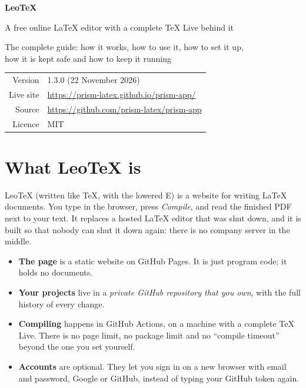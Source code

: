 \documentclass[11pt,a4paper]{article}
\newcommand{\leotex}{Leo\TeX{}}
\begin{document}
\begin{titlepage}
\centering
\vspace*{3cm}
{\fontsize{56}{60}\selectfont\bfseries\color{accent}\leotex{}}\par
\vspace{0.6cm}
{\Large A free online \LaTeX{} editor with a complete \TeX{} Live behind it}\par
\vspace{1.2cm}
{\large The complete guide: how it works, how to use it, how to set it up,\\ how it is kept safe and how to keep it running}\par
\vfill
\begin{tabular}{rl}
Version & 1.3.0 (22 November 2026)\\
Live site & \url{https://prism-latex.github.io/prism-app/}\\
Source & \url{https://github.com/prism-latex/prism-app}\\
Licence & MIT
\end{tabular}
\vspace{2cm}
\end{titlepage}

\tableofcontents
\clearpage

\section{What \leotex{} is}

\leotex{} (written like \TeX{}, with the lowered E) is a website for writing \LaTeX{} documents. You type in the browser, press
\emph{Compile}, and read the finished PDF next to your text. It replaces a hosted \LaTeX{} editor that was shut down, and it is built
so that nobody can shut it down again: there is no company server in the middle.

\begin{itemize}
  \item \textbf{The page} is a static website on GitHub Pages. It is just program code; it holds no documents.
  \item \textbf{Your projects} live in a \emph{private GitHub repository that you own}, with the full history of every change.
  \item \textbf{Compiling} happens in GitHub Actions, on a machine with a complete \TeX{} Live. There is no page limit, no package limit
        and no ``compile timeout'' beyond the one you set yourself.
  \item \textbf{Accounts} are optional. They let you sign in on a new browser with email and password, Google or GitHub, instead of
        typing your GitHub token again.
\end{itemize}
\end{document}
